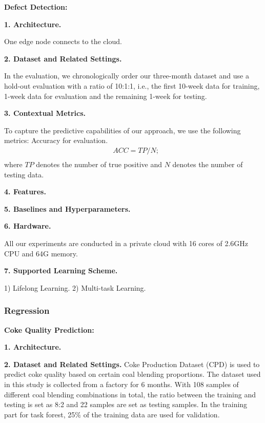  
\vspace{0.2cm} \noindent
\textbf{Defect Detection:}

\textbf{1. Architecture.}

One edge node connects to the cloud. 

\textbf{2. Dataset and Related Settings.}

In the evaluation, we chronologically order our three-month dataset and use a hold-out evaluation with a ratio of 10:1:1, i.e., the first 10-week data for training, 1-week data for evaluation and the remaining 1-week for testing.

\textbf{3. Contextual Metrics.}

To capture the predictive capabilities of our approach, we use the following metrics: Accuracy for evaluation.
\noindent
\begin{equation*}
\begin{split}
&ACC = TP / N; \\
\end{split}
\end{equation*}
where $TP$ denotes the number of true positive and $N$ denotes the number of testing data. 

\textbf{4. Features.}

\textbf{5. Baselines and Hyperparameters.}

\textbf{6. Hardware.}

All our experiments are conducted in a private cloud with 16 cores of 2.6GHz CPU and 64G memory.

\textbf{7. Supported Learning Scheme.}

1) Lifelong Learning. 2) Multi-task Learning. 


\subsubsection{Regression}

\textbf{Coke Quality Prediction:} 

\textbf{1. Architecture.}

\textbf{2. Dataset and Related Settings.}
Coke Production Dataset (CPD) is used to predict coke quality based on certain coal blending proportions. The dataset used in this study is collected from a factory for 6 months. With 108 samples of different coal blending combinations in total, the ratio between the training and testing is set as 8:2 and 22 samples are set as testing samples. In the training part for task forest, 25$\%$ of the training data are used for validation. 

